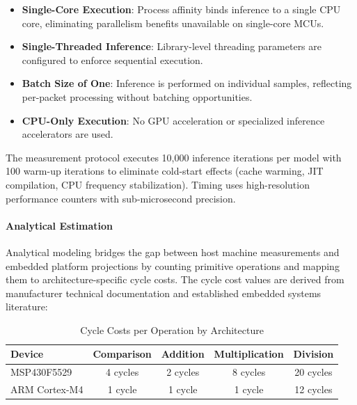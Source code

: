 \begin{itemize}
    \item \textbf{Single-Core Execution}: Process affinity binds inference to a single CPU core, eliminating parallelism benefits unavailable on single-core MCUs.
    \item \textbf{Single-Threaded Inference}: Library-level threading parameters are configured to enforce sequential execution.
    \item \textbf{Batch Size of One}: Inference is performed on individual samples, reflecting per-packet processing without batching opportunities.
    \item \textbf{CPU-Only Execution}: No GPU acceleration or specialized inference accelerators are used.
\end{itemize}

The measurement protocol executes 10,000 inference iterations per model with 100 warm-up iterations to eliminate cold-start effects (cache warming, JIT compilation, CPU frequency stabilization). Timing uses high-resolution performance counters with sub-microsecond precision.

\paragraph{Analytical Estimation} Analytical modeling bridges the gap between host machine measurements and embedded platform projections by counting primitive operations and mapping them to architecture-specific cycle costs. The cycle cost values are derived from manufacturer technical documentation and established embedded systems literature:

\begin{table}[htbp]
\centering
\caption{Cycle Costs per Operation by Architecture}
\label{tab:cycle_costs}
\begin{tabular}{lcccc}
\hline
\textbf{Device} & \textbf{Comparison} & \textbf{Addition} & \textbf{Multiplication} & \textbf{Division} \\
\hline
MSP430F5529 & 4 cycles & 2 cycles & 8 cycles & 20 cycles \\
ARM Cortex-M4 & 1 cycle & 1 cycle & 1 cycle & 12 cycles \\
\hline
\end{tabular}
\end{table}

